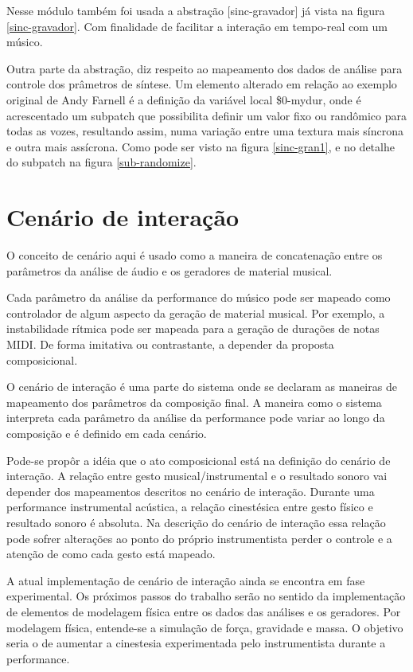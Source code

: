 \documentclass[draft]{ppgmus}
\begin{document}
Nesse módulo também foi usada a abstração [sinc-gravador] já vista na figura \ref{sinc-gravador}.
Com finalidade de facilitar a interação em tempo-real com um músico.

Outra parte da abstração, diz respeito ao mapeamento dos dados de análise para controle
dos prâmetros de síntese. Um elemento alterado em relação ao exemplo original de Andy
Farnell é a definição da variável local \$0-mydur, onde é acrescentado um subpatch que 
possibilita definir um valor fixo ou randômico para todas as vozes, resultando assim, numa variação entre
uma textura mais síncrona e outra mais assícrona. Como pode ser visto na figura \ref{sinc-gran1},
e no detalhe do subpatch na figura \ref{sub-randomize}.


\pagebreak

\section{Cenário de interação}


O conceito de cenário aqui é usado como a maneira de concatenação
entre os parâmetros da análise de áudio e os geradores de material
musical.


Cada parâmetro da análise da performance do músico pode ser mapeado como controlador
de algum aspecto da geração de material musical. Por exemplo,
a instabilidade rítmica pode ser mapeada para a geração de durações
de notas MIDI. De forma imitativa ou contrastante, a depender da
proposta composicional.

O cenário de interação é uma parte do sistema onde se declaram
as maneiras de mapeamento dos parâmetros da composição final. A maneira
como o sistema interpreta cada parâmetro da análise da performance pode
variar ao longo da composição e é definido em cada cenário.

Pode-se propôr a idéia que o ato composicional está na definição
do cenário de interação. A relação entre gesto musical/instrumental e 
o resultado sonoro vai depender dos mapeamentos descritos no cenário
de interação. Durante uma performance instrumental acústica, a relação
cinestésica entre gesto físico e resultado sonoro é absoluta. Na descrição
do cenário de interação essa relação pode sofrer alterações ao ponto
do próprio instrumentista perder o controle e a atenção de como cada
gesto está mapeado.

A atual implementação de cenário de interação ainda se encontra em fase 
experimental. Os próximos passos do trabalho serão no sentido da implementação
de elementos de modelagem física entre os dados das análises e os geradores.
Por modelagem física, entende-se a simulação de força, gravidade e massa. O 
objetivo seria o de aumentar a cinestesia experimentada pelo instrumentista 
durante a performance.
\end{document}
